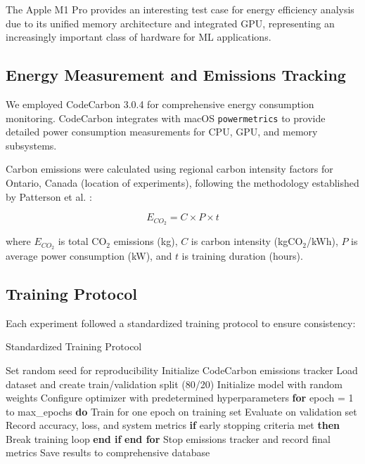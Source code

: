 \documentclass[conference]{IEEEtran}
\begin{document}
The Apple M1 Pro provides an interesting test case for energy efficiency analysis due to its unified memory architecture and integrated GPU, representing an increasingly important class of hardware for ML applications.

\subsection{Energy Measurement and Emissions Tracking}

We employed CodeCarbon 3.0.4 for comprehensive energy consumption monitoring. CodeCarbon integrates with macOS \texttt{powermetrics} to provide detailed power consumption measurements for CPU, GPU, and memory subsystems.

Carbon emissions were calculated using regional carbon intensity factors for Ontario, Canada (location of experiments), following the methodology established by Patterson et al. \cite{patterson2021carbon}:

\begin{equation}
E_{CO_2} = C \times P \times t
\end{equation}

where $E_{CO_2}$ is total CO$_2$ emissions (kg), $C$ is carbon intensity (kgCO$_2$/kWh), $P$ is average power consumption (kW), and $t$ is training duration (hours).

\subsection{Training Protocol}

Each experiment followed a standardized training protocol to ensure consistency:

\begin{algorithm}
\caption{Standardized Training Protocol}
\begin{algorithmic}[1]
\STATE Set random seed for reproducibility
\STATE Initialize CodeCarbon emissions tracker
\STATE Load dataset and create train/validation split (80/20)
\STATE Initialize model with random weights
\STATE Configure optimizer with predetermined hyperparameters
\STATE \textbf{for} epoch = 1 to max\_epochs \textbf{do}
\STATE \quad Train for one epoch on training set
\STATE \quad Evaluate on validation set
\STATE \quad Record accuracy, loss, and system metrics
\STATE \quad \textbf{if} early stopping criteria met \textbf{then}
\STATE \quad \quad Break training loop
\STATE \quad \textbf{end if}
\STATE \textbf{end for}
\STATE Stop emissions tracker and record final metrics
\STATE Save results to comprehensive database
\end{algorithmic}
\end{algorithm}
\end{document}

